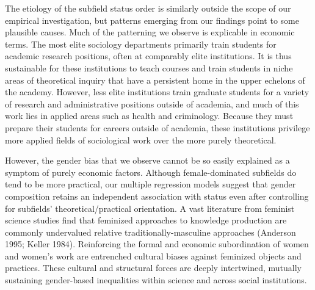 \documentclass{article}
\begin{document}
The etiology of the subfield status order is similarly outside the scope
of our empirical investigation, but patterns emerging from our findings
point to some plausible causes. Much of the patterning we observe is
explicable in economic terms. The most elite sociology departments
primarily train students for academic research positions, often at
comparably elite institutions. It is thus sustainable for these
institutions to teach courses and train students in niche areas of
theoretical inquiry that have a persistent home in the upper echelons of
the academy. However, less elite institutions train graduate students
for a variety of research and administrative positions outside of
academia, and much of this work lies in applied areas such as health and
criminology. Because they must prepare their students for careers
outside of academia, these institutions privilege more applied fields of
sociological work over the more purely theoretical.

However, the gender bias that we observe cannot be so easily explained
as a symptom of purely economic factors. Although female-dominated
subfields do tend to be more practical, our multiple regression models
suggest that gender composition retains an independent association with
status even after controlling for subfields' theoretical/practical
orientation. A vast literature from feminist science studies find that
feminized approaches to knowledge production are commonly undervalued
relative traditionally-masculine approaches (Anderson 1995; Keller
1984). Reinforcing the formal and economic subordination of women and
women's work are entrenched cultural biases against feminized objects
and practices. These cultural and structural forces are deeply
intertwined, mutually sustaining gender-based inequalities within
science and across social institutions.
\end{document}
